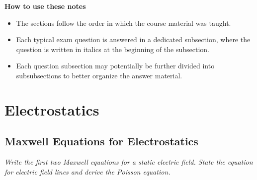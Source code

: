 \documentclass[11pt, a4paper]{article}
\begin{document}
\vspace{5mm}
\textbf{How to use these notes}
\begin{itemize}
    \item The sections follow the order in which the course material was taught.

    \item Each typical exam question is answered in a dedicated subsection, where the question is written in italics at the beginning of the subsection.
    
    \item Each question subsection may potentially be further divided into subsubsections to better organize the answer material.

\end{itemize}


\newpage

\pagestyle{empty}  %
\tableofcontents

\newpage

\pagestyle{fancy}  %

\section{Electrostatics}

\subsection{Maxwell Equations for Electrostatics}
\textit{Write the first two Maxwell equations for a static electric field. State the equation for electric field lines and derive the Poisson equation.}
    
\end{document}
